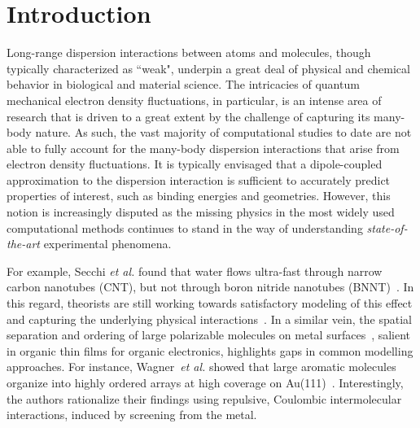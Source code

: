\documentclass[aps,prl,groupaddress, twocolumn]{revtex4-1}
\begin{document}
\section*{Introduction} 
Long-range dispersion interactions between atoms and molecules, though typically characterized as ``weak", underpin a great deal of physical and chemical behavior in biological and material science. The intricacies of quantum mechanical electron density fluctuations, in particular, is an intense area of research that is driven to a great extent by the challenge of capturing its many-body nature. As such, the vast majority of computational studies to date are not able to fully account for the many-body dispersion interactions that arise from electron density fluctuations. It is typically envisaged that a dipole-coupled approximation to the dispersion interaction is sufficient to accurately predict properties of interest, such as binding energies and geometries. However, this notion is increasingly disputed as the missing physics in the most widely used computational methods continues to stand in the way of understanding \textit{state-of-the-art} experimental phenomena. 

For example, Secchi \textit{et al.} found that water flows ultra-fast through narrow carbon nanotubes (CNT), but not through boron nitride nanotubes (BNNT)~\cite{secchi2016massive}. In this regard, theorists are still working towards satisfactory modeling of this effect and capturing the underlying physical interactions~\cite{Michaelides2016,Kannam2013,Striolo2016,Mattia2015266}. In a similar vein, the spatial separation and ordering of large polarizable molecules on metal surfaces~\cite{Wagner2010,Thussing2016}, salient in organic thin films for organic electronics, highlights gaps in common modelling approaches. For instance, Wagner~\textit{et al.} showed that large aromatic molecules organize into highly ordered arrays at high coverage on Au(111)~\cite{Wagner2010}. Interestingly, the authors rationalize their findings using repulsive, Coulombic intermolecular interactions, induced by screening from the metal. 

\end{document}
